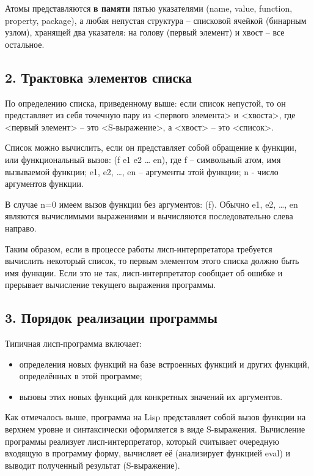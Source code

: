 Атомы представляются \textbf{в памяти} пятью указателями  (name, value, function, property, package), а любая непустая структура --  списковой ячейкой (бинарным узлом), хранящей два указателя: на голову (первый элемент) и хвост -- все остальное.


\subsection*{2. Трактовка элементов списка}

По определению списка, приведенному выше: если список непустой, то он представляет из себя точечную пару из  <первого элемента> и <хвоста>, где <первый элемент> -- это <S-выражение>, а <хвост> -- это <список>.

Список можно вычислить, если он представляет собой обращение к  функции, или функциональный вызов: (f e1 e2 … en), где f – символьный атом, имя вызываемой функции; e1, e2, …, en – аргументы этой функции; n - число аргументов функции.

В случае n=0 имеем вызов функции без аргументов: (f). Обычно e1, e2, …, en являются вычислимыми выражениями и вычисляются последовательно слева направо.

Таким образом, если в процессе работы лисп-интерпретатора  требуется вычислить некоторый список, то первым элементом этого   списка должно быть имя функции. Если это не так, лисп-интерпретатор  сообщает об ошибке и прерывает вычисление текущего выражения  программы.

\subsection*{3. Порядок реализации программы}

Типичная лисп-программа включает:
\begin{itemize}
	\item определения новых функций на базе встроенных функций и других функций, определённых в этой программе;
	\item {вызовы этих новых функций для конкретных значений их аргументов.}
\end{itemize}

Как отмечалось выше, программа на Lisp представляет собой вызов функции на верхнем уровне и синтаксически оформляется в виде S-выражения. Вычисление программы реализует лисп-интерпретатор, который считывает очередную входящую в программу форму, вычисляет её (анализирует функцией eval) и выводит полученный результат (S-выражение).


